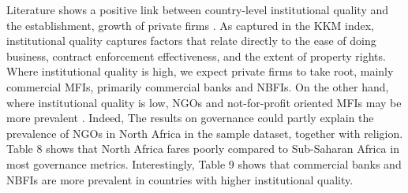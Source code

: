 \documentclass[a4paper,nobind]{templates/ociamthesis}
\begin{document}
Literature shows a positive link between country-level institutional quality and the establishment, growth of private firms \autocite{sobel2008testing}. As captured in the KKM index, institutional quality captures factors that relate directly to the ease of doing business, contract enforcement effectiveness, and the extent of property rights. Where institutional quality is high, we expect private firms to take root, mainly commercial MFIs, primarily commercial banks and NBFIs. On the other hand, where institutional quality is low, NGOs and not-for-profit oriented MFIs may be more prevalent \autocite{kuzey2021link}. Indeed, The results on governance could partly explain the prevalence of NGOs in North Africa in the sample dataset, together with religion. Table 8 shows that North Africa fares poorly compared to Sub-Saharan Africa in most governance metrics. Interestingly, Table 9 shows that commercial banks and NBFIs are more prevalent in countries with higher institutional quality.
\end{document}
